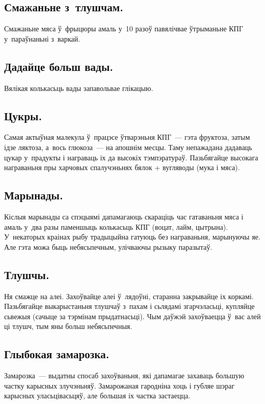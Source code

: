 \subsection{Смажаньне з~тлушчам.}
Смажаньне мяса ў~фрыцюры амаль у~10 разоў павялічвае ўтрыманьне КПГ у~параўнаньні з~варкай.

\subsection{Дадайце больш вады.}
Вялікая колькасьць вады запавольвае глікацыю.

\subsection{Цукры.}
Самая актыўная малекула ў~працэсе ўтварэньня КПГ~--- гэта фруктоза, затым ідзе ляктоза, а~вось глюкоза~--- на апошнім месцы. Таму непажадана дадаваць цукар у~прадукты і награваць іх да высокіх тэмпэратураў. Пазьбягайце высокага награваньня пры харчовых спалучэньнях бялок + вугляводы (мука і мяса).


\subsection{Марынады.}
Кіслыя марынады са спэцыямі дапамагаюць скараціць час гатаваньня мяса і амаль у~два разы паменшыць колькасьць КПГ (воцат, лайм, цытрына). У~некаторых краінах рыбу традыцыйна гатуюць без награваньня, марынуючы яе. Але гэта можа быць небясьпечным, улічваючы рызыку паразытаў.

\subsection{Тлушчы.}
Ня смажце на алеі. Захоўвайце алеі ў~лядоўні, старанна закрывайце іх коркамі. Пазьбягайце выкарыстаньня тлушчаў з~пахам і сьлядамі згарчэласьці, купляйце сьвежыя (сачыце за тэрмінам прыдатнасьці). Чым даўжэй захоўваецца ў~вас алей ці тлушч, тым яны больш небясьпечныя.

\subsection{Глыбокая замарозка.}
Замарозка~--- выдатны спосаб захоўваньня, які дапамагае захаваць большую частку карысных злучэньняў. Замарожаная гародніна хоць і губляе шэраг карысных уласьцівасьцяў, але большая іх частка застаецца.

